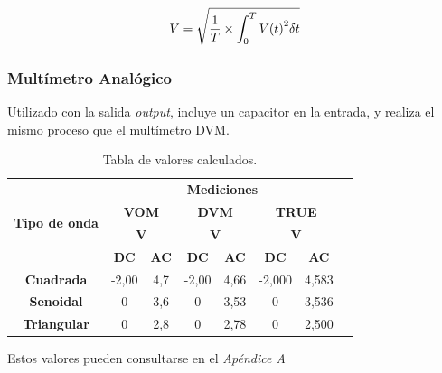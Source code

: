 \documentclass{article}
\begin{document}
\begin{equation}
V = \sqrt{ {{1}\over{T}} \times \int_{0}^{T} {V(t)}^2 \delta t}
\end{equation}
\smallskip


\subsubsection{Multímetro Analógico}

Utilizado con la salida \textit{output}, incluye un capacitor en la entrada, y realiza el mismo proceso que el multímetro DVM.
\medskip


\begin{table}[!hbt]
	\begin{center}

		\begin{tabular}{|c|c|c|c|c|c|c|c|} \hline
			\multirow{4}{*}{\textbf{Tipo de onda}}

			& \multicolumn{6}{c|}{\textbf{Mediciones}} \\\cline{2-7}
			& \multicolumn{2}{c|}{\textbf{VOM}} & \multicolumn{2}{c|}{\textbf{DVM}} & \multicolumn{2}{c|}{\textbf{TRUE}} \\\cline{2-7}
			& \multicolumn{2}{c|}{\textbf{V}} & \multicolumn{2}{c|}{\textbf{V}} & \multicolumn{2}{c|}{\textbf{V}} \\\cline{2-7}
			& \textbf{DC} & \textbf{AC} & \textbf{DC} & \textbf{AC} & \textbf{DC} & \textbf{AC} \\\hline
			\textbf{Cuadrada} & -2,00 & 4,7  & -2,00 & 4,66 & -2,000 & 4,583 \\\hline
			\textbf{Senoidal} & 0 & 3,6 & 0 & 3,53 & 0 &  3,536 \\\hline
			\textbf{Triangular} & 0 & 2,8 & 0 & 2,78 & 0 & 2,500 \\\hline
		\end{tabular}

	\caption{Tabla de valores calculados.}
	\end{center}
\end{table}
\medskip

Estos valores pueden consultarse en el \textit{Apéndice A}\\\bigskip
\end{document}
